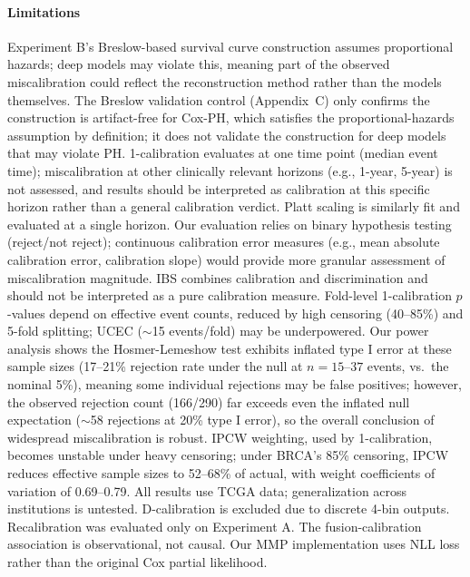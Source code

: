\documentclass[pmlr]{jmlr}
\begin{document}
\paragraph{Limitations}

Experiment B's Breslow-based survival curve construction assumes proportional hazards; deep models may violate this, meaning part of the observed miscalibration could reflect the reconstruction method rather than the models themselves. The Breslow validation control (Appendix~C) only confirms the construction is artifact-free for Cox-PH, which satisfies the proportional-hazards assumption by definition; it does not validate the construction for deep models that may violate PH. 1-calibration evaluates at one time point (median event time); miscalibration at other clinically relevant horizons (e.g., 1-year, 5-year) is not assessed, and results should be interpreted as calibration at this specific horizon rather than a general calibration verdict. Platt scaling is similarly fit and evaluated at a single horizon. Our evaluation relies on binary hypothesis testing (reject/not reject); continuous calibration error measures (e.g., mean absolute calibration error, calibration slope) would provide more granular assessment of miscalibration magnitude. IBS combines calibration and discrimination and should not be interpreted as a pure calibration measure. Fold-level 1-calibration $p$-values depend on effective event counts, reduced by high censoring (40--85\%) and 5-fold splitting; UCEC ($\sim$15 events/fold) may be underpowered. Our power analysis shows the Hosmer-Lemeshow test exhibits inflated type I error at these sample sizes (17--21\% rejection rate under the null at $n = 15$--$37$ events, vs.\ the nominal 5\%), meaning some individual rejections may be false positives; however, the observed rejection count (166/290) far exceeds even the inflated null expectation ($\sim$58 rejections at 20\% type I error), so the overall conclusion of widespread miscalibration is robust. IPCW weighting, used by 1-calibration, becomes unstable under heavy censoring; under BRCA's 85\% censoring, IPCW reduces effective sample sizes to 52--68\% of actual, with weight coefficients of variation of 0.69--0.79. All results use TCGA data; generalization across institutions is untested. D-calibration is excluded due to discrete 4-bin outputs. Recalibration was evaluated only on Experiment A. The fusion-calibration association is observational, not causal. Our MMP implementation uses NLL loss rather than the original Cox partial likelihood.
\end{document}
